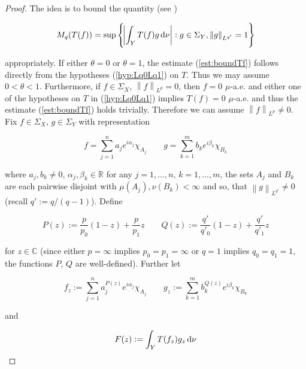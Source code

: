 \begin{proof}
	The idea is to bound the quantity (see \cite[189]{folland:real_analysis:1999})
	
	\begin{equation*}
		M_q( T(f)) = \sup\cbr{\abs{ \int_Y T(f)g \d \nu} : g \in \Sigma_Y, \norm[0]{ g}_{L^{q'}} = 1}
	\end{equation*}

	\noindent appropriately. If either $\theta = 0$ or $\theta = 1$, the estimate (\ref{est:boundTf}) follows directly from the hypotheses (\ref{hyp:Lq0Lq1}) on $T$. Thus we may assume \underline{$0 < \theta < 1$}. Furthermore, if $f \in \Sigma_X$, $\left\| f \right\|_{L^p} = 0$, then $f = 0$ $\mu$-a.e. and either one of the hypotheses on $T$ in (\ref{hyp:Lq0Lq1}) implies $T(f) = 0$ $\mu$-a.e. and thus the estimate (\ref{est:boundTf}) holds trivially. Therefore we can assume \underline{$\left\| f\right\|_{L^p} \neq 0$}. Fix $f \in \Sigma_X$, $g \in \Sigma_Y$ with representation
	
\begin{equation*}
	f = \sum_{j = 1}^n a_j e^{i\alpha_j}\chi_{A_j} \qquad g = \sum_{k = 1}^m b_k e^{i\beta_k}\chi_{B_k}
\end{equation*}

\noindent where $a_j,b_k \neq 0$, $\alpha_j,\beta_k \in \mathbb{R}$ for any $j = 1,\dots,n$, $k = 1,\dots,m$, the sets $A_j$ and $B_k$ are each pairwise disjoint with $\mu\left( A_j \right),\nu\left( B_k \right) < \infty$ and so, that $\left\| g\right\|_{L^{q'}} \neq 0$ (recall $q' := q/\left( q - 1 \right)$). Define

\begin{equation*}
	P(z) := \frac{p}{p_0}(1 - z) + \frac{p}{p_1}z \qquad Q(z) := \frac{q'}{q'_0}(1 - z) + \frac{q'}{q'_1}z
\end{equation*}

\noindent for $z \in \mathbb{C}$ (since either $p = \infty$ implies $p_0 = p_1 = \infty$ or $q = 1$ implies $q_0 = q_1 = 1$, the functions $P$, $Q$ are well-defined). Further let
				
\begin{equation}
	f_z := \sum_{j = 1}^n a^{P(z)}_j e^{i\alpha_j}\chi_{A_j} \qquad g_z :=  \sum_{k = 1}^m b^{Q(z)}_k e^{i\beta_k}\chi_{B_k}
	\label{eq:def_fzgz}
\end{equation}
				
\noindent and 

\begin{equation}
	F(z) := \int_Y T(f_z)g_z\mathop{}\!\mathrm{d}\nu
	\label{eq:def_F}
\end{equation}


\end{proof}
